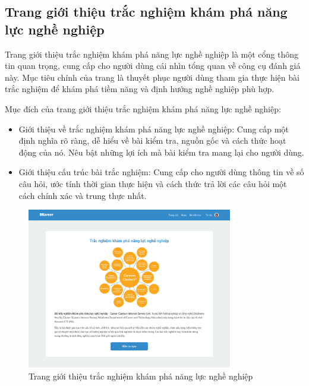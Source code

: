 \subsection{Trang giới thiệu trắc nghiệm khám phá năng lực nghề nghiệp}
Trang giới thiệu trắc nghiệm khám phá năng lực nghề nghiệp là một cổng thông tin quan trọng, cung cấp cho người dùng cái nhìn tổng quan về công cụ đánh giá này. Mục tiêu chính của trang là thuyết phục người dùng tham gia thực hiện bài trắc nghiệm để khám phá tiềm năng và định hướng nghề nghiệp phù hợp.

Mục đích của trang giới thiệu trắc nghiệm khám phá năng lực nghề nghiệp:
\begin{itemize}
    \item Giới thiệu về trắc nghiệm khám phá năng lực nghề nghiệp: Cung cấp một định nghĩa rõ ràng, dễ hiểu về bài kiểm tra, nguồn gốc và cách thức hoạt động của nó. Nêu bật những lợi ích mà bài kiểm tra mang lại cho người dùng.
    \item Giới thiệu cấu trúc bài trắc nghiệm: Cung cấp cho người dùng thông tin về số câu hỏi, ước tính thời gian thực hiện và cách thức trả lời các câu hỏi một cách chính xác và trung thực nhất.
\end{itemize}

\begin{figure}[H]
    \centering
    \includegraphics[width=0.8\textwidth]
    {images/chap5/ccDetail.png}
    \vspace{0.5cm}
    \caption{Trang giới thiệu trắc nghiệm khám phá năng lực nghề nghiệp}
\end{figure}


